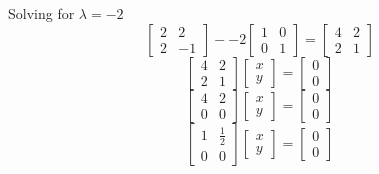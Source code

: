 \documentclass[12pt,a4paper]{paper}
\begin{document}
\begin{enumerate}
\begin{enumerate}
\begin{multicols}{2}
Solving for $\lambda = -2$
\begin{equation}
\left[\begin{array}{cc}
    2 & 2 \\
    2 & -1
\end{array}\right] -  -2\left[\begin{array}{cc}
    1 & 0 \\
    0 & 1
\end{array}\right] = \left[\begin{array}{cc}
    4 & 2 \\
    2 & 1
\end{array}\right]
\end{equation}
\begin{equation}
\left[\begin{array}{cc}
    4 & 2 \\
    2 & 1
\end{array}\right]\left[\begin{array}{c}
    x \\
    y
\end{array}\right] = \left[\begin{array}{c}
    0 \\
    0
\end{array}\right]
\end{equation}
\begin{equation}
\left[\begin{array}{cc}
    4 & 2 \\
    0 & 0
\end{array}\right]\left[\begin{array}{c}
    x \\
    y
\end{array}\right] = \left[\begin{array}{c}
    0 \\
    0
\end{array}\right]
\end{equation}
\begin{equation}
\left[\begin{array}{cc}
    1 & \frac{1}{2} \\
    0 & 0
\end{array}\right]\left[\begin{array}{c}
    x \\
    y
\end{array}\right] = \left[\begin{array}{c}
    0 \\
    0
\end{array}\right]

\end{equation}
\end{multicols}
\end{enumerate}
\end{enumerate}
\end{document}
